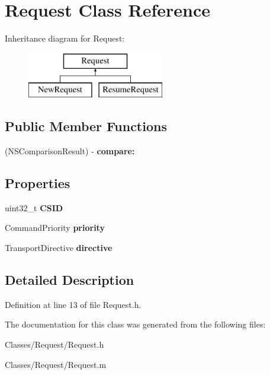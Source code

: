 \hypertarget{interface_request}{
\section{Request Class Reference}
\label{interface_request}
}
Inheritance diagram for Request:\begin{figure}[H]
\begin{center}
\leavevmode
\includegraphics[height=2.000000cm]{interface_request}
\end{center}
\end{figure}
\subsection*{Public Member Functions}
\begin{DoxyCompactItemize}
\item 
\hypertarget{interface_request_a43cc207b20e6d5c3eb8b17fe2bed0b0b}{
(NSComparisonResult) -\/ {\bfseries compare:}}
\label{interface_request_a43cc207b20e6d5c3eb8b17fe2bed0b0b}

\end{DoxyCompactItemize}
\subsection*{Properties}
\begin{DoxyCompactItemize}
\item 
\hypertarget{interface_request_aabb17e703dbf170ae47668b9d7db69e6}{
uint32\_\-t {\bfseries CSID}}
\label{interface_request_aabb17e703dbf170ae47668b9d7db69e6}

\item 
\hypertarget{interface_request_a0ee28e9b610bed687b3d4fddd2aee5c0}{
CommandPriority {\bfseries priority}}
\label{interface_request_a0ee28e9b610bed687b3d4fddd2aee5c0}

\item 
\hypertarget{interface_request_ae881076d92360e623f33705af986fbf3}{
TransportDirective {\bfseries directive}}
\label{interface_request_ae881076d92360e623f33705af986fbf3}

\end{DoxyCompactItemize}


\subsection{Detailed Description}


Definition at line 13 of file Request.h.



The documentation for this class was generated from the following files:\begin{DoxyCompactItemize}
\item 
Classes/Request/Request.h\item 
Classes/Request/Request.m\end{DoxyCompactItemize}
